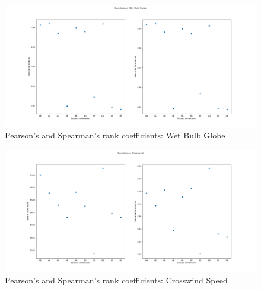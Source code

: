 \documentclass[a4paper]{article}
\begin{document}
            \begin{figure}[H]
            \centering
                \includegraphics[width=\textwidth]{images/Correlation_Wet_bulb_Globe.png}
                \caption{Pearson’s and Spearman’s rank coefficients: Wet Bulb Globe}
                \label{fig:Correlations}
            \end{figure}

            \begin{figure}[H]
            \centering
                \includegraphics[width=\textwidth]{images/Correlation_Crosswind_Speed.png}
                \caption{Pearson’s and Spearman’s rank coefficients: Crosswind Speed}
                \label{fig:Correlations}
            \end{figure}
\end{document}
